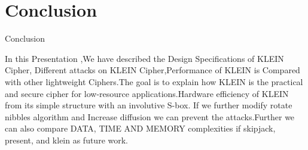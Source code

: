 \section{Conclusion}

\begin{frame}{Conclusion}

In this Presentation ,We have described the Design Specifications of KLEIN Cipher, Different attacks on KLEIN Cipher,Performance of KLEIN is Compared with other lightweight Ciphers.The goal is to explain how KLEIN is the practical and secure cipher for low-resource applications.Hardware efficiency of KLEIN from its simple structure with an involutive S-box. If we further modify rotate nibbles algorithm and Increase diffusion we can prevent the attacks.Further we can also compare DATA, TIME AND MEMORY complexities if skipjack, present, and klein as future work.

\end{frame}

